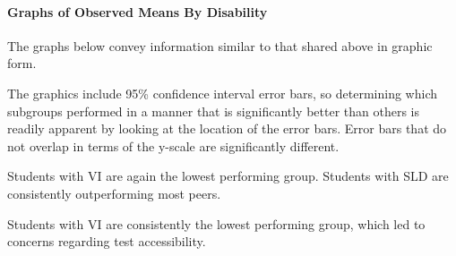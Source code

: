 \documentclass[]{article}
\let\oldparagraph\paragraph
\renewcommand{\paragraph}[1]{\oldparagraph{#1}\mbox{}}
\begin{document}
\clearpage

\paragraph{Graphs of Observed Means By
Disability}\label{graphs-of-observed-means-by-disability}

The graphs below convey information similar to that shared above in
graphic form.

The graphics include 95\% confidence interval error bars, so determining
which subgroups performed in a manner that is significantly better than
others is readily apparent by looking at the location of the error bars.
Error bars that do not overlap in terms of the y-scale are significantly
different.

Students with VI are again the lowest performing group. Students with
SLD are consistently outperforming most peers.

Students with VI are consistently the lowest performing group, which led
to concerns regarding test accessibility.

\FloatBarrier
\end{document}
